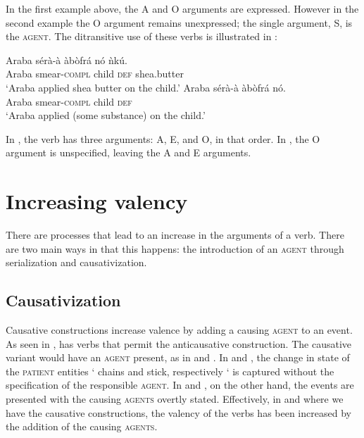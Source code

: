 \documentclass[output=paper]{langsci/langscibook}
\begin{document}
In the first example above, the A and O arguments are expressed. However in the second example the O argument remains unexpressed; the single argument, S, is the \textsc{agent}. The ditransitive use of these verbs is illustrated in :

\ea\label{ex:41.osam}
\ea\label{ex:41a.osam}
\gll  Araba  sérà-à    àbòfrá  nó  ǹkú.\\
       Araba  smear-\textsc{compl}  child  \textsc{def}  shea.butter\\
\glt `Araba applied shea butter on the child.'
\ex\label{ex:41b.osam}
\gll   Araba  sérà-à    àbòfrá  nó.\\
       Araba  smear-\textsc{compl}  child  \textsc{def}\\
\glt `Araba applied (some substance) on the child.'
\z 
\z 


In , the verb has three arguments: A, E, and O, in that order. In , the O argument is unspecified, leaving the A and E arguments.

\section{Increasing valency}\label{§5:increasing.osam}

There are processes that lead to an increase in the arguments of a verb. There are two main ways in  that this happens: the introduction of an \textsc{agent} through serialization and causativization.

\subsection{Causativization}\label{§5.1:causativization.osam}

Causative constructions increase valence by adding a causing \textsc{agent} to an event. As seen in ,  has verbs that permit the anticausative construction. The causative variant would have an \textsc{agent} present, as in  and . In  and , the change in state of the \textsc{patient} entities ` chains and stick, respectively ` is captured without the specification of the responsible \textsc{agent}. In  and , on the other hand, the events are presented with the causing \textsc{agents} overtly stated. Effectively, in  and  where we have the causative constructions, the valency of the verbs has been increased by the addition of the causing \textsc{agents}.
\end{document}
